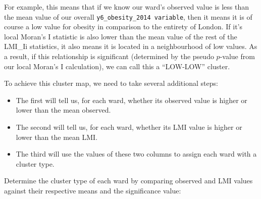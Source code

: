 \documentclass[
]{book}
\providecommand{\tightlist}{%
  \setlength{\itemsep}{0pt}\setlength{\parskip}{0pt}}
\begin{document}
For example, this means that if we know our ward's observed value is less than the mean value of our overall \texttt{y6\_obesity\_2014\ variable}, then it means it is of course a low value for obesity in comparison to the entirety of London. If it's local Moran's I statistic is also lower than the mean value of the rest of the LMI\_Ii statistics, it also means it is located in a neighbourhood of low values. As a result, if this relationship is significant (determined by the pseudo \(p\)-value from our local Moran's I calculation), we can call this a ``LOW-LOW'' cluster.

To achieve this cluster map, we need to take several additional steps:

\begin{itemize}
\tightlist
\item
  The first will tell us, for each ward, whether its observed value is higher or lower than the mean observed.
\item
  The second will tell us, for each ward, whether its LMI value is higher or lower than the mean LMI.
\item
  The third will use the values of these two columns to assign each ward with a cluster type.
\end{itemize}

Determine the cluster type of each ward by comparing observed and LMI values against their respective means and the significance value:
\end{document}
